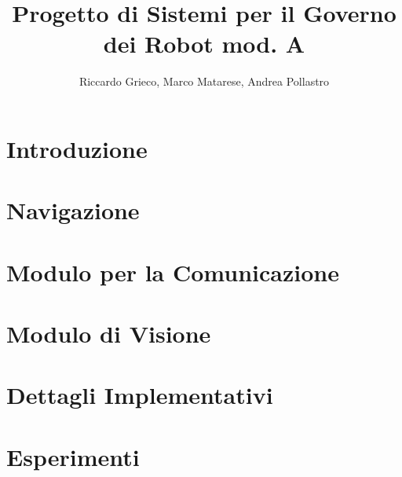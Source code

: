 \documentclass[12pt]{article}
\title{Progetto di Sistemi per il Governo dei Robot mod. A}
\author{Riccardo Grieco, Marco Matarese, Andrea Pollastro}
\begin{document}
	
	\newpage
	
	\tableofcontents
	
	\newpage
	
	\section{Introduzione}
		
		\clearpage
		
	\section{Navigazione}
		
		\newpage
		
	\section{Modulo per la Comunicazione}
		
		\newpage
		
	\section{Modulo di Visione}
		
		\newpage
		
	\section{Dettagli Implementativi}
		\newpage
	
	\section{Esperimenti}
		\newpage
	
\end{document}

